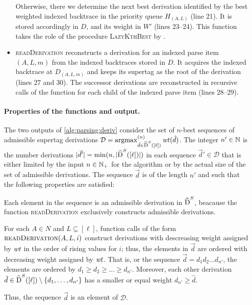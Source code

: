 \documentclass[../../document.tex]{subfiles}
\begin{document}
\begin{itemize}
            Otherwise, there we determine the next best derivation identified by the best weighted indexed backtrace in the priority queue \(H_{(A, L)}\) (line 21).
            It is stored accordingly in \(D\), and its weight in \(W'\) (lines 23--24).
            This function takes the role of the procedure \textsc{LazyKthBest} by .
        \item \textsc{readDerivation} reconstructs a derivation for an indexed parse item \((A, L, m)\) from the indexed backtraces stored in \(D\).
            It acquires the indexed backtrace at \(D_{(A, L, m)}\) and keeps its supertag as the root of the derivation (lines 27 and 30).
            The successor derivations are reconstructed in recursive calls of the function for each child of the indexed parse item (lines 28--29).
    \end{itemize}

    \paragraph{Properties of the functions and output.}
    The two outputs of \cref{alg:parsing:deriv} consider the set of \(n\)-best sequences of admissible  supertag derivations \(\mathcal{D} = \operatorname{arg max}^{(n)}_{\hat{d} \in \widehat{\operatorname{D}}^S([\ell])} \mathit{wt}(\hat{d})\).
    The integer \(n' \in \mathbb{N}\) is the number derivations \(|\vec{d}'| = \min(n, |\widehat{\operatorname{D}}^S([\ell])|)\) in each sequence \(\vec{d}' \in \mathcal{D}\) that is either limited by the input \(n \in \mathbb{N}_+\) for the algorithm or by the actual size of the set of admissible derivations.
    The sequence \(\vec{d}\) is of the length \(n'\) and such that the following properties are satisfied:
    \begin{compactitem}
        \item Each element in the sequence is an admissible derivation in \(\widehat{\operatorname{D}}^S\), beacause the function \textsc{readDerivation} exclusively constructs admissible derivations.
        \item For each \(A\in N\) and \(L \subseteq [\ell]\), function calls of the form \(\Call{readDerivation}{A, L, i}\) construct derivations with descreasing weight assigned by \(\mathit{wt}\) in the order of rising values for \(i\); thus, the elements in $\vec{d}$ are ordered with decreasing weight assigned by \(\mathit{wt}\). That is, or the sequence \(\vec{d} = d_1 d_2 \ldots d_{n'}\), the elements are ordered by \(d_1 \geq d_2 \geq \ldots \geq d_{n'}\). Moreover, each other derivation \(\hat{d} \in  \widehat{\operatorname{D}}^S([\ell]) \setminus \{d_1, \ldots, d_{n'}\}\) has a smaller or equal weight \(d_{n'} \geq \hat{d}\).
    \end{compactitem}
    Thus, the sequence \(\vec{d}\) is an element of \(\mathcal{D}\).
\end{document}
